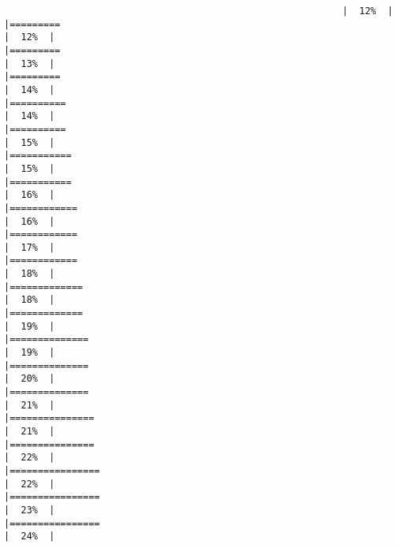 \documentclass[10pt,letterpaper]{article}
\begin{document}
\begin{verbatim}
                                                            |  12%  |                                                                              |=========                                                             |  12%  |                                                                              |=========                                                             |  13%  |                                                                              |=========                                                             |  14%  |                                                                              |==========                                                            |  14%  |                                                                              |==========                                                            |  15%  |                                                                              |===========                                                           |  15%  |                                                                              |===========                                                           |  16%  |                                                                              |============                                                          |  16%  |                                                                              |============                                                          |  17%  |                                                                              |============                                                          |  18%  |                                                                              |=============                                                         |  18%  |                                                                              |=============                                                         |  19%  |                                                                              |==============                                                        |  19%  |                                                                              |==============                                                        |  20%  |                                                                              |==============                                                        |  21%  |                                                                              |===============                                                       |  21%  |                                                                              |===============                                                       |  22%  |                                                                              |================                                                      |  22%  |                                                                              |================                                                      |  23%  |                                                                              |================                                                      |  24%  |                                                                              
\end{verbatim}
\end{document}
